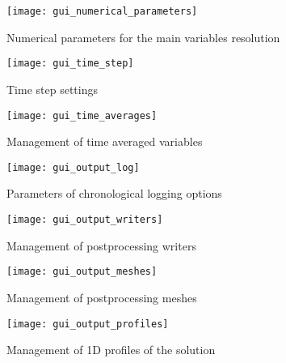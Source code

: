 {{\begin{figure}[!ht]
\begin{center}
\texttt{[image: gui\_numerical\_parameters]}
\caption{Numerical parameters for the main variables resolution}
\label{fig:gui_numerical_parameters}
\end{center}
\end{figure}

\begin{figure}[!ht]
\begin{center}
\texttt{[image: gui\_time\_step]}
\caption{Time step settings}
\label{fig:gui_time_step}
\end{center}
\end{figure}

\begin{figure}[!ht]
\begin{center}
\texttt{[image: gui\_time\_averages]}
\caption{Management of time averaged variables}
\label{fig:gui_time_averages}
\end{center}
\end{figure}

\begin{figure}[!ht]
\begin{center}
\texttt{[image: gui\_output\_log]}
\caption{Parameters of chronological logging options}
\label{fig:gui_output_log}
\end{center}
\end{figure}

\begin{figure}[!ht]
\begin{center}
\texttt{[image: gui\_output\_writers]}
\caption{Management of postprocessing writers}
\label{fig:gui_output_writers}
\end{center}
\end{figure}

\begin{figure}[!ht]
\begin{center}
\texttt{[image: gui\_output\_meshes]}
\caption{Management of postprocessing meshes}
\label{fig:gui_output_meshes}
\end{center}
\end{figure}

\begin{figure}[!ht]
\begin{center}
\texttt{[image: gui\_output\_profiles]}
\caption{Management of 1D profiles of the solution}
\label{fig:gui_output_profiles}
\end{center}
\end{figure}

}}
